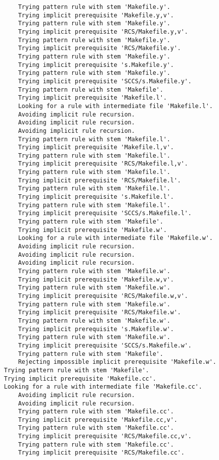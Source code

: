 \documentclass[11pt]{article}
\begin{document}
\begin{enumerate}
\begin{enumerate}
\begin{verbatim}
    Trying pattern rule with stem 'Makefile.y'.
    Trying implicit prerequisite 'Makefile.y,v'.
    Trying pattern rule with stem 'Makefile.y'.
    Trying implicit prerequisite 'RCS/Makefile.y,v'.
    Trying pattern rule with stem 'Makefile.y'.
    Trying implicit prerequisite 'RCS/Makefile.y'.
    Trying pattern rule with stem 'Makefile.y'.
    Trying implicit prerequisite 's.Makefile.y'.
    Trying pattern rule with stem 'Makefile.y'.
    Trying implicit prerequisite 'SCCS/s.Makefile.y'.
    Trying pattern rule with stem 'Makefile'.
    Trying implicit prerequisite 'Makefile.l'.
    Looking for a rule with intermediate file 'Makefile.l'.
    Avoiding implicit rule recursion.
    Avoiding implicit rule recursion.
    Avoiding implicit rule recursion.
    Trying pattern rule with stem 'Makefile.l'.
    Trying implicit prerequisite 'Makefile.l,v'.
    Trying pattern rule with stem 'Makefile.l'.
    Trying implicit prerequisite 'RCS/Makefile.l,v'.
    Trying pattern rule with stem 'Makefile.l'.
    Trying implicit prerequisite 'RCS/Makefile.l'.
    Trying pattern rule with stem 'Makefile.l'.
    Trying implicit prerequisite 's.Makefile.l'.
    Trying pattern rule with stem 'Makefile.l'.
    Trying implicit prerequisite 'SCCS/s.Makefile.l'.
    Trying pattern rule with stem 'Makefile'.
    Trying implicit prerequisite 'Makefile.w'.
    Looking for a rule with intermediate file 'Makefile.w'.
    Avoiding implicit rule recursion.
    Avoiding implicit rule recursion.
    Avoiding implicit rule recursion.
    Trying pattern rule with stem 'Makefile.w'.
    Trying implicit prerequisite 'Makefile.w,v'.
    Trying pattern rule with stem 'Makefile.w'.
    Trying implicit prerequisite 'RCS/Makefile.w,v'.
    Trying pattern rule with stem 'Makefile.w'.
    Trying implicit prerequisite 'RCS/Makefile.w'.
    Trying pattern rule with stem 'Makefile.w'.
    Trying implicit prerequisite 's.Makefile.w'.
    Trying pattern rule with stem 'Makefile.w'.
    Trying implicit prerequisite 'SCCS/s.Makefile.w'.
    Trying pattern rule with stem 'Makefile'.
    Rejecting impossible implicit prerequisite 'Makefile.w'.
Trying pattern rule with stem 'Makefile'.
Trying implicit prerequisite 'Makefile.cc'.
Looking for a rule with intermediate file 'Makefile.cc'.
    Avoiding implicit rule recursion.
    Avoiding implicit rule recursion.
    Trying pattern rule with stem 'Makefile.cc'.
    Trying implicit prerequisite 'Makefile.cc,v'.
    Trying pattern rule with stem 'Makefile.cc'.
    Trying implicit prerequisite 'RCS/Makefile.cc,v'.
    Trying pattern rule with stem 'Makefile.cc'.
    Trying implicit prerequisite 'RCS/Makefile.cc'.

\end{verbatim}
\end{enumerate}
\end{enumerate}
\end{document}
